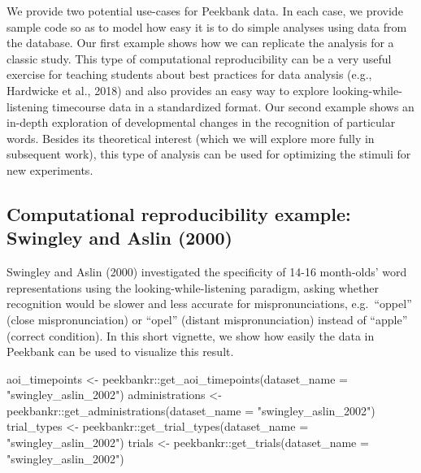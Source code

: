 \documentclass[
  english,
  man,floatsintext]{apa6}
\newenvironment{Shaded}{\begin{snugshade}}{\end{snugshade}}
\newcommand{\AttributeTok}[1]{\textcolor[rgb]{0.77,0.63,0.00}{#1}}
\newcommand{\FunctionTok}[1]{\textcolor[rgb]{0.00,0.00,0.00}{#1}}
\newcommand{\NormalTok}[1]{#1}
\newcommand{\OtherTok}[1]{\textcolor[rgb]{0.56,0.35,0.01}{#1}}
\newcommand{\SpecialCharTok}[1]{\textcolor[rgb]{0.00,0.00,0.00}{#1}}
\newcommand{\StringTok}[1]{\textcolor[rgb]{0.31,0.60,0.02}{#1}}
\begin{document}
We provide two potential use-cases for Peekbank data. In each case, we provide sample code so as to model how easy it is to do simple analyses using data from the database. Our first example shows how we can replicate the analysis for a classic study. This type of computational reproducibility can be a very useful exercise for teaching students about best practices for data analysis (e.g., Hardwicke et al., 2018) and also provides an easy way to explore looking-while-listening timecourse data in a standardized format. Our second example shows an in-depth exploration of developmental changes in the recognition of particular words. Besides its theoretical interest (which we will explore more fully in subsequent work), this type of analysis can be used for optimizing the stimuli for new experiments.

\hypertarget{computational-reproducibility-example-swingley2000}{%
\subsection{Computational reproducibility example: Swingley and Aslin (2000)}\label{computational-reproducibility-example-swingley2000}}

Swingley and Aslin (2000) investigated the specificity of 14-16 month-olds' word representations using the looking-while-listening paradigm, asking whether recognition would be slower and less accurate for mispronunciations, e.g.~``oppel'' (close mispronunciation) or ``opel'' (distant mispronunciation) instead of ``apple'' (correct condition). In this short vignette, we show how easily the data in Peekbank can be used to visualize this result.

\begin{Shaded}
\begin{Highlighting}[]
\NormalTok{aoi\_timepoints }\OtherTok{\textless{}{-}}\NormalTok{ peekbankr}\SpecialCharTok{::}\FunctionTok{get\_aoi\_timepoints}\NormalTok{(}\AttributeTok{dataset\_name =} \StringTok{"swingley\_aslin\_2002"}\NormalTok{)}
\NormalTok{administrations }\OtherTok{\textless{}{-}}\NormalTok{ peekbankr}\SpecialCharTok{::}\FunctionTok{get\_administrations}\NormalTok{(}\AttributeTok{dataset\_name =} \StringTok{"swingley\_aslin\_2002"}\NormalTok{)}
\NormalTok{trial\_types }\OtherTok{\textless{}{-}}\NormalTok{ peekbankr}\SpecialCharTok{::}\FunctionTok{get\_trial\_types}\NormalTok{(}\AttributeTok{dataset\_name =} \StringTok{"swingley\_aslin\_2002"}\NormalTok{)}
\NormalTok{trials }\OtherTok{\textless{}{-}}\NormalTok{ peekbankr}\SpecialCharTok{::}\FunctionTok{get\_trials}\NormalTok{(}\AttributeTok{dataset\_name =} \StringTok{"swingley\_aslin\_2002"}\NormalTok{)}
\end{Highlighting}
\end{Shaded}
\end{document}
